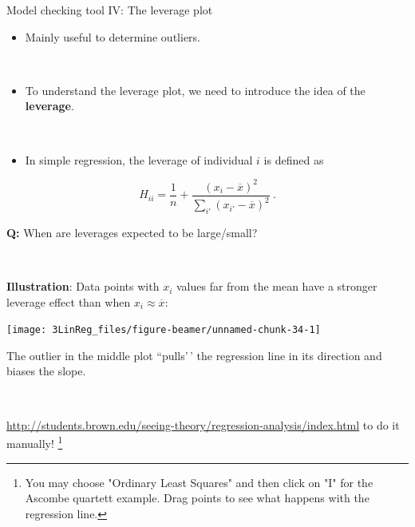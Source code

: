 \documentclass[
  10pt,
  ignorenonframetext,
]{beamer}
\providecommand{\tightlist}{%
  \setlength{\itemsep}{0pt}\setlength{\parskip}{0pt}}
\begin{document}
\begin{frame}
\begin{block}{Model checking tool IV: The leverage plot}
\protect\hypertarget{model-checking-tool-iv-the-leverage-plot}{}
\(~\)

\begin{itemize}
\tightlist
\item
  Mainly useful to determine outliers.
\end{itemize}

\(~\)

\begin{itemize}
\tightlist
\item
  To understand the leverage plot, we need to introduce the idea of the
  \textbf{leverage}.
\end{itemize}

\(~\)

\begin{itemize}
\tightlist
\item
  In simple regression, the leverage of individual \(i\) is defined as
\end{itemize}

\begin{equation} 
H_{ii} = \frac{1}{n} + \frac{(x_i-\overline{x})^2}{\sum_{i'}(x_{i'}-\overline{x})^2} \ . 
\end{equation}

\vspace{7mm}

\textbf{Q:} When are leverages expected to be large/small?

\(~\)
\end{block}
\end{frame}

\begin{frame}
\textbf{Illustration}: Data points with \(x_i\) values far from the mean
have a stronger leverage effect than when \(x_i\approx \overline{x}\):

\begin{center}\texttt{[image: 3LinReg\_files/figure-beamer/unnamed-chunk-34-1]} \end{center}

The outlier in the middle plot ``pulls'\,' the regression line in its
direction and biases the slope.

\(~\)

\href{http://students.brown.edu/seeing-theory/regression-analysis/index.html}{http://students.brown.edu/seeing-theory/regression-analysis/index.html}
to do it manually!
\footnote{You may choose "Ordinary Least Squares" and then click on "I" for the Ascombe quartett example. Drag points to see what happens with the regression line.}
\end{frame}
\end{document}

